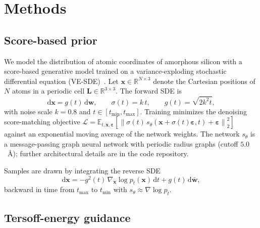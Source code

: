 \section{Methods}
\label{sec:methods}

\subsection{Score-based prior}
\label{sec:prior}

We model the distribution of atomic coordinates of amorphous silicon with a
score-based generative model trained on a variance-exploding stochastic
differential equation (VE-SDE)~\cite{song2021score}. Let
$\mathbf{x}\in\mathbb{R}^{N\times 3}$ denote the Cartesian positions of $N$
atoms in a periodic cell $\mathbf{L}\in\mathbb{R}^{3\times 3}$. The forward
SDE is
\begin{equation}
    \mathrm{d}\mathbf{x} = g(t)\,\mathrm{d}\mathbf{w},
    \qquad
    \sigma(t) = k\,t,
    \qquad
    g(t) = \sqrt{2 k^{2} t},
    \label{eq:fwd-sde}
\end{equation}
with noise scale $k=0.8$ and $t\in[t_{\min},t_{\max}]$. Training minimizes the
denoising score-matching objective
$
    \mathcal{L}
    = \mathbb{E}_{t,\mathbf{x},\bm{\varepsilon}}\!\left[
        \left\lVert \sigma(t)\,s_{\theta}(\mathbf{x}+\sigma(t)\bm{\varepsilon},t)
                    + \bm{\varepsilon}\right\rVert_{2}^{2}
      \right]
$
against an exponential moving average of the network weights. The network
$s_\theta$ is a message-passing graph neural network with periodic radius
graphs (cutoff $5.0$~\AA); further architectural details are in the code
repository.

Samples are drawn by integrating the reverse SDE
\begin{equation}
    \mathrm{d}\mathbf{x}
    = -g^{2}(t)\,\nabla_{\mathbf{x}}\log p_t(\mathbf{x})\,\mathrm{d}t
      + g(t)\,\mathrm{d}\bar{\mathbf{w}},
    \label{eq:reverse-sde}
\end{equation}
backward in time from $t_{\max}$ to $t_{\min}$ with $s_\theta\approx
\nabla\log p_t$.

\subsection{Tersoff-energy guidance}
\label{sec:tersoff}

